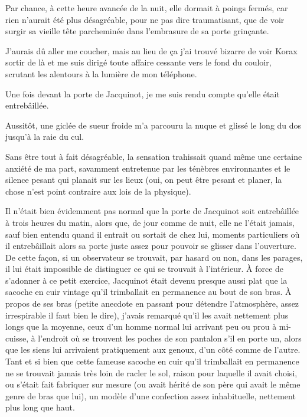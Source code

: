 Par chance, à cette heure avancée de la nuit, elle dormait à poings fermés, car rien n’aurait été plus désagréable, pour ne pas dire traumatisant, que de voir surgir sa vieille tête parcheminée dans l’embrasure de sa porte grinçante.

J’aurais dû aller me coucher, mais au lieu de ça j’ai trouvé bizarre de voir Korax sortir de là et me suis dirigé toute affaire cessante vers le fond du couloir, scrutant les alentours à la lumière de mon téléphone.

Une fois devant la porte de Jacquinot, je me suis rendu compte qu’elle était entrebâillée.

Aussitôt, une giclée de sueur froide m’a parcouru la nuque et glissé le long du dos jusqu’à la raie du cul.

Sans être tout à fait désagréable, la sensation trahissait quand même une certaine anxiété de ma part, savamment entretenue par les ténèbres environnantes et le silence pesant qui planait sur les lieux (oui, on peut être pesant et planer, la chose n’est point contraire aux lois de la physique).

Il n’était bien évidemment pas normal que la porte de Jacquinot soit entrebâillée à trois heures du matin, alors que, de jour comme de nuit, elle ne l’était jamais, sauf bien entendu quand il entrait ou sortait de chez lui, moments particuliers où il entrebâillait alors sa porte juste assez pour pouvoir se glisser dans l’ouverture. De cette façon, si un observateur se trouvait, par hasard ou non, dans les parages, il lui était impossible de distinguer ce qui se trouvait à l’intérieur. À force de s’adonner à ce petit exercice, Jacquinot était devenu presque aussi plat que la sacoche en cuir vintage qu’il trimballait en permanence au bout de son bras. À propos de ses bras (petite anecdote en passant pour détendre l’atmosphère, assez irrespirable il faut bien le dire), j’avais remarqué qu’il les avait nettement plus longs que la moyenne, ceux d’un homme normal lui arrivant peu ou prou à mi-cuisse, à l’endroit où se trouvent les poches de son pantalon s’il en porte un, alors que les siens lui arrivaient pratiquement aux genoux, d’un côté comme de l’autre. Tant et si bien que cette fameuse sacoche en cuir qu’il trimballait en permanence ne se trouvait jamais très loin de racler le sol, raison pour laquelle il avait choisi, ou s’était fait fabriquer sur mesure (ou avait hérité de son père qui avait le même genre de bras que lui), un modèle d’une confection assez inhabituelle, nettement plus long que haut.


